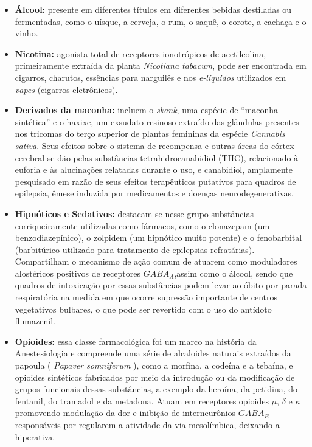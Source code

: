 \documentclass[
]{book}
\begin{document}
\begin{itemize}
\item
  \textbf{Álcool:} presente em diferentes títulos em diferentes bebidas destiladas ou fermentadas, como o uísque, a cerveja, o rum, o saquê, o corote, a cachaça e o vinho.
\item
  \textbf{Nicotina:} agonista total de receptores ionotrópicos de acetilcolina, primeiramente extraída da planta \emph{Nicotiana tabacum}, pode ser encontrada em cigarros, charutos, essências para narguilês e nos \emph{e-líquidos} utilizados em \emph{vapes} (cigarros eletrônicos).
\item
  \textbf{Derivados da maconha:} incluem o \emph{skank}, uma espécie de ``maconha sintética'' e o haxixe, um exsudato resinoso extraído das glândulas presentes nos tricomas do terço superior de plantas femininas da espécie \emph{Cannabis sativa}. Seus efeitos sobre o sistema de recompensa e outras áreas do córtex cerebral se dão pelas substâncias tetrahidrocanabidiol (THC), relacionado à euforia e às alucinações relatadas durante o uso, e canabidiol, amplamente pesquisado em razão de seus efeitos terapêuticos putativos para quadros de epilepsia, êmese induzida por medicamentos e doenças neurodegenerativas.
\item
  \textbf{Hipnóticos e Sedativos:} destacam-se nesse grupo substâncias corriqueiramente utilizadas como fármacos, como o clonazepam (um benzodiazepínico), o zolpidem (um hipnótico muito potente) e o fenobarbital (barbitúrico utilizado para tratamento de epilepsias refratárias). Compartilham o mecanismo de ação comum de atuarem como moduladores alostéricos positivos de receptores \(GABA_A\),assim como o álcool, sendo que quadros de intoxicação por essas substâncias podem levar ao óbito por parada respiratória na medida em que ocorre supressão importante de centros vegetativos bulbares, o que pode ser revertido com o uso do antídoto flumazenil.
\item
  \textbf{Opioides:} essa classe farmacológica foi um marco na história da Anestesiologia e compreende uma série de alcaloides naturais extraídos da papoula ( \emph{Papaver somniferum} ), como a morfina, a codeína e a tebaína, e opioides sintéticos fabricados por meio da introdução ou da modificação de grupos funcionais dessas substâncias, a exemplo da heroína, da petidina, do fentanil, do tramadol e da metadona. Atuam em receptores opioides \(\mu\), \(\delta\) e \(\kappa\) promovendo modulação da dor e inibição de interneurônios \(GABA_B\) responsáveis por regularem a atividade da via mesolímbica, deixando-a hiperativa.

\end{itemize}
\end{document}

